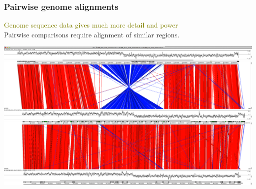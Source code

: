 
%
\begin{frame}
  \frametitle{Pairwise genome alignments}
  \textcolor{olive}{Genome sequence data gives much more detail and power} \\
  Pairwise comparisons require alignment of similar regions.
  \begin{center}
    \includegraphics[width=\textwidth]{images/pairwise_genome_alignment}
  \end{center}  
\end{frame}

